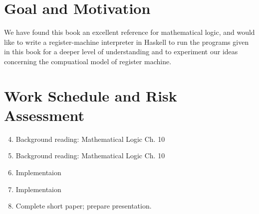 \documentclass[english]{article}
\begin{document}
\section{Goal and Motivation}
We have found this book an excellent reference for mathematical logic, 
and would like to write a register-machine interpreter in Haskell 
to run the programs given in this book for a deeper level of understanding 
and to experiment our ideas concerning the compuatioal model of register machine.
%
%
\section{Work Schedule and Risk Assessment}
\begin{enumerate}[Week 1.]
\setcounter{enumi}{3}
\item Background reading: Mathematical Logic \cite{ebbinghaus2013mathematical} Ch. 10
\item Background reading: Mathematical Logic \cite{ebbinghaus2013mathematical} Ch. 10
\item Implementaion
\item Implementaion
\item Complete short paper; prepare presentation.
\end{enumerate}


%

\end{document}
